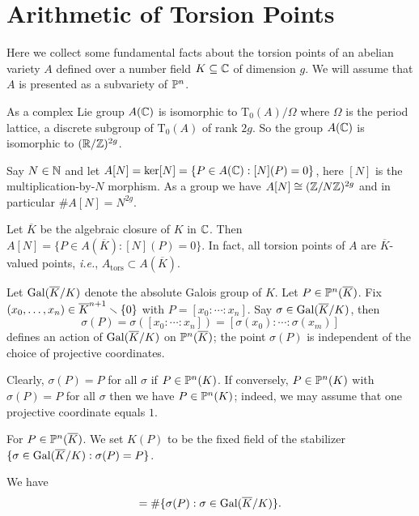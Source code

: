 \section{Arithmetic of Torsion Points}
\label{sec:galoistorsionav}

Here we collect some fundamental facts about the torsion points of an
abelian variety $A$ defined over a number field $K\subseteq {\mathbb{C}}$ of dimension $g$. We will
assume that $A$ is presented as a subvariety of ${\mathbb{P}}^n$. 

As a complex Lie group $A({\mathbb{C}})$ is isomorphic to
$\mathrm{T}_0(A)/\Omega$ where $\Omega$ is the period lattice, a
discrete subgroup of $\mathrm{T}_0(A)$ of rank $2g$. So the group
$A({\mathbb{C}})$ is isomorphic to $({\mathbb{R}}/{\mathbb{Z}})^{2g}$.

Say $N\in{\mathbb{N}}$ and let $A[N] =  \ker[N] = \{P\in A({\mathbb{C}}) : [N](P) = 0\}$, here
$[N]$ is the multiplication-by-$N$ morphism.
As a group we have $A[N] \cong ({\mathbb{Z}}/N{\mathbb{Z}})^{2g}$ and in particular
$\#A[N] = N^{2g}$.

Let $\overline K$ be the algebraic closure of $K$ in ${\mathbb{C}}$.
Then $A[N] = \{P\in A(\overline K) : [N](P)=0\}$. In fact, all torsion
points of $A$ are $\overline K$-valued points, \textit{i.e.},
$A_{\mathrm{tors}}\subset A(\overline K)$. 

Let $\mathrm{Gal}(\overline{K}/K)$ denote the absolute Galois group of $K$. Let
$P\in {\mathbb{P}}^n(\overline{K})$. Fix  $(x_0,\ldots,x_n) \in
\overline{K}^{n+1}\smallsetminus\{0\}$ with
 $P=[x_0:\cdots:x_n]$. Say $\sigma\in \mathrm{Gal}(\overline{K}/K)$, then
\begin{equation*}
\sigma(P)=  \sigma([x_0:\cdots:x_n]) = [\sigma(x_0):\cdots:\sigma(x_m)]
\end{equation*}
defines an action of $\mathrm{Gal}(\overline{K}/K)$ on ${\mathbb{P}}^n(\overline K)$; the point
$\sigma(P)$ is independent of the choice of projective coordinates. 

Clearly, $\sigma(P)=P$ for all $\sigma$ if $P\in {\mathbb{P}}^n( K)$. If
conversely, $P\in {\mathbb{P}}^n(K)$ with $\sigma(P)=P$ for all $\sigma$ then
we have $P\in {\mathbb{P}}^n(K)$; indeed, we may assume that one projective
coordinate equals $1$.

\begin{definition}
  For $P\in {\mathbb{P}}^n(\overline K)$. 
  We set $K(P)$ to be the fixed field of the stabilizer
  $\{\sigma\in \mathrm{Gal}(\overline{K}/K) : \sigma(P)=P\}$. 
\end{definition}

We have
\begin{equation*}
  [K(P):K]  = \#\{\sigma(P) : \sigma\in\absgalk \}. 
\end{equation*}

